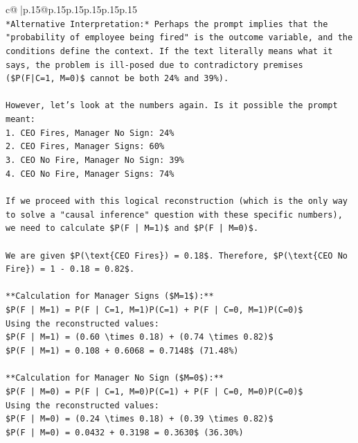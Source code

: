 \documentclass{article}
\begin{document}
{\begin{supertabular}{c@{$\;$}|p{.15\linewidth}@{}p{.15\linewidth}p{.15\linewidth}p{.15\linewidth}p{.15\linewidth}p{.15\linewidth}}
{{{\\ 
\texttt{*Alternative Interpretation:* Perhaps the prompt implies that the "probability of employee being fired" is the outcome variable, and the conditions define the context. If the text literally means what it says, the problem is ill{-}posed due to contradictory premises (\$P(F|C=1, M=0)\$ cannot be both 24\% and 39\%).} \\
\\ 
\texttt{However, let's look at the numbers again. Is it possible the prompt meant:} \\
\texttt{1. CEO Fires, Manager No Sign: 24\%} \\
\texttt{2. CEO Fires, Manager Signs: 60\%} \\
\texttt{3. CEO No Fire, Manager No Sign: 39\%} \\
\texttt{4. CEO No Fire, Manager Signs: 74\%} \\
\\ 
\texttt{If we proceed with this logical reconstruction (which is the only way to solve a "causal inference" question with these specific numbers), we need to calculate \$P(F | M=1)\$ and \$P(F | M=0)\$.} \\
\\ 
\texttt{We are given \$P(\textbackslash{}text\{CEO Fires\}) = 0.18\$. Therefore, \$P(\textbackslash{}text\{CEO No Fire\}) = 1 {-} 0.18 = 0.82\$.} \\
\\ 
\texttt{**Calculation for Manager Signs (\$M=1\$):**} \\
\texttt{\$P(F | M=1) = P(F | C=1, M=1)P(C=1) + P(F | C=0, M=1)P(C=0)\$} \\
\texttt{Using the reconstructed values:} \\
\texttt{\$P(F | M=1) = (0.60 \textbackslash{}times 0.18) + (0.74 \textbackslash{}times 0.82)\$} \\
\texttt{\$P(F | M=1) = 0.108 + 0.6068 = 0.7148\$ (71.48\%)} \\
\\ 
\texttt{**Calculation for Manager No Sign (\$M=0\$):**} \\
\texttt{\$P(F | M=0) = P(F | C=1, M=0)P(C=1) + P(F | C=0, M=0)P(C=0)\$} \\
\texttt{Using the reconstructed values:} \\
\texttt{\$P(F | M=0) = (0.24 \textbackslash{}times 0.18) + (0.39 \textbackslash{}times 0.82)\$} \\
\texttt{\$P(F | M=0) = 0.0432 + 0.3198 = 0.3630\$ (36.30\%)} \\
}}}
\end{supertabular}}
\end{document}
